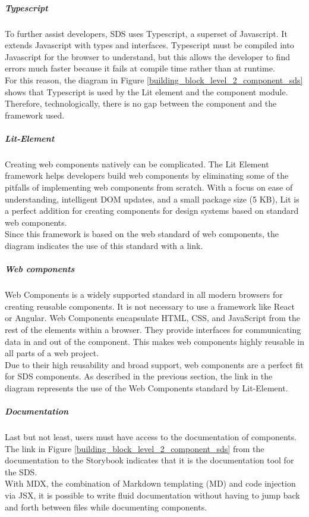 \subparagraph{Typescript}
To further assist developers, \ac{SDS} uses Typescript, a superset of Javascript. It extends Javascript with types and interfaces. Typescript must be compiled into Javascript for the browser to understand, but this allows the developer to find errors much faster because it fails at compile time rather than at runtime. \citep{microsoft_typescript_nodate} \\
For this reason, the diagram in Figure \ref{building_block_level_2_component_sds} shows that Typescript is used by the Lit element and the component module. Therefore, technologically, there is no gap between the component and the framework used.

\subparagraph{Lit-Element}
Creating web components natively can be complicated. The Lit Element framework helps developers build web components by eliminating some of the pitfalls of implementing web components from scratch. With a focus on ease of understanding, intelligent DOM updates, and a small package size (5 KB), Lit is a perfect addition for creating components for design systems based on standard web components. \citep{lit_nodate} \\
Since this framework is based on the web standard of web components, the diagram indicates the use of this standard with a link.

\subparagraph{Web components}
Web Components is a widely supported standard in all modern browsers for creating reusable components. It is not necessary to use a framework like React or Angular. Web Components encapsulate \ac{HTML}, \ac{CSS}, and JavaScript from the rest of the elements within a browser. They provide interfaces for communicating data in and out of the component. This makes web components highly reusable in all parts of a web project. \citep{mdn_web_component_nodate} \\
Due to their high reusability and broad support, web components are a perfect fit for \ac{SDS} components. As described in the previous section, the link in the diagram represents the use of the Web Components standard by Lit-Element.

\subparagraph{Documentation}
Last but not least, users must have access to the documentation of components. The link in Figure \ref{building_block_level_2_component_sds} from the documentation to the Storybook indicates that it is the documentation tool for the \ac{SDS}. \\
With MDX, the combination of Markdown templating (MD) and code injection via JSX, it is possible to write fluid documentation without having to jump back and forth between files while documenting components. \citep{otander_markdown_2017} \\

